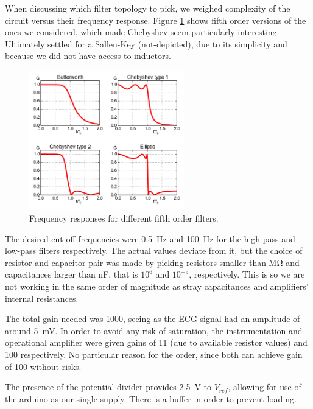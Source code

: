 

When discussing which filter topology to pick, we weighed complexity of the circuit versus their frequency response. Figure \ref{fig:FrequencyResponses} shows fifth order versions of the ones we considered, which made Chebyshev seem particularly interesting. Ultimately settled for a Sallen-Key (not-depicted), due to its simplicity and because we did not have access to inductors.
\begin{figure}[h]
    \centering
	\includegraphics[width=0.6\textwidth]{./figures/FrequencyResponses.png}
    \caption{Frequency responses for different fifth order filters. \cite{Wikipedia}}
    \label{fig:FrequencyResponses}
\end{figure}

The desired cut-off frequencies were \SI{0.5}{\hertz} and \SI{100}{\hertz} for the high-pass and low-pass filters respectively. The actual values deviate from it, but the choice of resistor and capacitor pair was made by picking resistors smaller than \si{\mega\ohm} and capacitances larger than \si{\nano\farad}, that is $10^6$ and $10^{-9}$, respectively. This is so we are not working in the same order of magnitude as stray capacitances and amplifiers' internal resistances.   

The total gain needed was 1000, seeing as the ECG signal had an amplitude of around \SI{5}{\milli\volt}. In order to avoid any risk of saturation, the instrumentation and operational amplifier were given gains of 11 (due to available resistor values) and 100 respectively. No particular reason for the order, since both can achieve gain of 100 without risks.

The presence of the potential divider provides \SI{2.5}{\volt} to $V_{ref}$, allowing for use of the arduino as our single supply. There is a buffer in order to prevent loading.